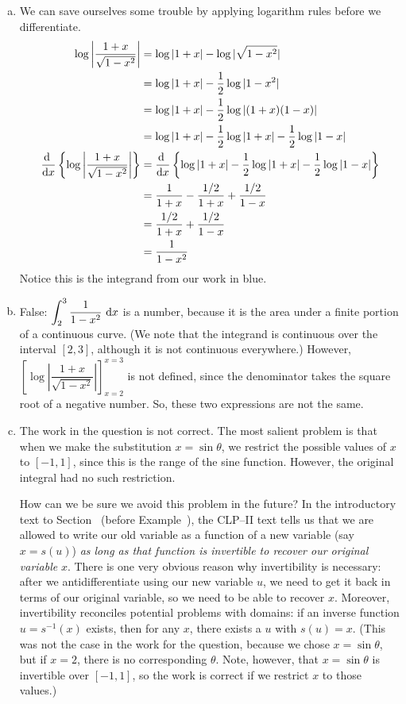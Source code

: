 \begin{solution}
\begin{enumerate}[(a)]
\item We can save ourselves some trouble by applying logarithm rules before we differentiate.
\begin{align*}
\log\left|  \dfrac{1+x}{\sqrt{1-x^2}}\right|&=\log|1+x| - \log|\sqrt{1-x^2}|\\
&=\log|1+x| - \frac{1}{2}\log|1-x^2|\\
&=\log|1+x| - \frac{1}{2}\log|(1+x)(1-x)|\\
&=\log|1+x| - \frac{1}{2}\log|1+x|- \frac{1}{2}\log|1-x|\\
\diff{}{x}\left\{\log\left|  \dfrac{1+x}{\sqrt{1-x^2}}\right|\right\}&=
\diff{}{x}\left\{\log|1+x| - \frac{1}{2}\log|1+x|- \frac{1}{2}\log|1-x|\right\}\\
&=\frac{1}{1+x} -  \frac{1/2}{1+x}+ \frac{1/2}{1-x}\\
&=  \frac{1/2}{1+x}+ \frac{1/2}{1-x}\\
&=\frac{1}{1-x^2}
\end{align*}
Notice this is the integrand from our work in blue.
\item False: $\displaystyle\int_{2}^{3} \frac{1}{1-x^2}~\mathrm{d}x$ is a number, because it is the area under a finite portion of a continuous curve. (We note that the integrand is continuous over the interval $[2,3]$, although it is not continuous everywhere.) However,
$\left[\log\left|  \dfrac{1+x}{\sqrt{1-x^2}}\right|\right]_{x=2}^{x=3}$ is not defined, since the denominator takes the square root of a negative number. So, these two expressions are not the same.
\item The work in the question is not correct. The most salient problem is that when we make the substitution $x=\sin\theta$, we restrict the possible values of $x$ to $[-1,1]$, since this is the range of the sine function. However, the original integral had no such restriction.

How can we be sure we avoid this problem in the future? In the introductory text to Section~ (before Example~), the
CLP--II text tells us that we are allowed to write our old variable as a function of a new variable (say $x=s(u)$) \emph{as long as that function is invertible to recover our original variable} $x$. There is one very obvious reason why invertibility is necessary: after we antidifferentiate using our new variable $u$, we need to get it back in terms of our original variable, so we need to be able to recover $x$. Moreover, invertibility  reconciles  potential problems with domains: if an inverse function $u=s^{-1}(x)$ exists, then for any $x$, there exists a $u$ with $s(u)=x$. (This was not the case in the work for the question, because we chose $x=\sin \theta$, but if $x=2$, there is no corresponding $\theta$. Note, however, that $x=\sin\theta$ is invertible over $[-1,1]$,  so the work is correct if we restrict $x$ to those values.)


\end{enumerate}
\end{solution}
